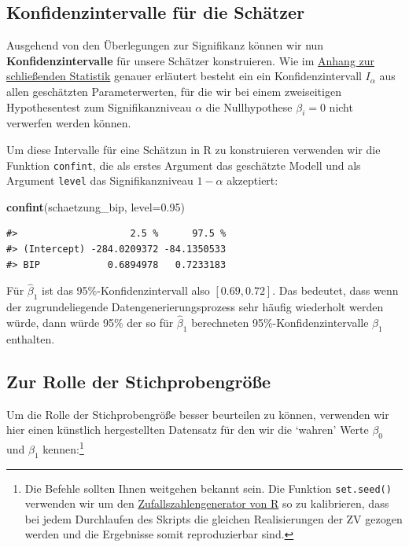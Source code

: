 \documentclass[]{book}
\newenvironment{Shaded}{\begin{snugshade}}{\end{snugshade}}
\newcommand{\KeywordTok}[1]{\textcolor[rgb]{0.13,0.29,0.53}{\textbf{#1}}}
\newcommand{\DataTypeTok}[1]{\textcolor[rgb]{0.13,0.29,0.53}{#1}}
\newcommand{\FloatTok}[1]{\textcolor[rgb]{0.00,0.00,0.81}{#1}}
\newcommand{\NormalTok}[1]{#1}
\let\rmarkdownfootnote\footnote%
\def\footnote{\protect\rmarkdownfootnote}
\begin{document}
\subsection{Konfidenzintervalle für die
Schätzer}\label{konfidenzintervalle-fur-die-schatzer}

Ausgehend von den Überlegungen zur Signifikanz können wir nun
\textbf{Konfidenzintervalle} für unsere Schätzer konstruieren. Wie im
\protect\hyperlink{stat-rep}{Anhang zur schließenden Statistik} genauer
erläutert besteht ein ein Konfidenzintervall \(I_{\alpha}\) aus allen
geschätzten Parameterwerten, für die wir bei einem zweiseitigen
Hypothesentest zum Signifikanzniveau \(\alpha\) die Nullhypothese
\(\beta_i=0\) nicht verwerfen werden können.

Um diese Intervalle für eine Schätzun in R zu konstruieren verwenden wir
die Funktion \texttt{confint}, die als erstes Argument das geschätzte
Modell und als Argument \texttt{level} das Signifikanzniveau
\(1-\alpha\) akzeptiert:

\begin{Shaded}
\begin{Highlighting}[]
\KeywordTok{confint}\NormalTok{(schaetzung_bip, }\DataTypeTok{level=}\FloatTok{0.95}\NormalTok{)}
\end{Highlighting}
\end{Shaded}

\begin{verbatim}
#>                    2.5 %      97.5 %
#> (Intercept) -284.0209372 -84.1350533
#> BIP            0.6894978   0.7233183
\end{verbatim}

Für \(\hat{\beta}_1\) ist das 95\%-Konfidenzintervall also
\([0.69, 0.72]\). Das bedeutet, dass wenn der zugrundeliegende
Datengenerierungsprozess sehr häufig wiederholt werden würde, dann würde
95\% der so für \(\hat{\beta}_1\) berechneten 95\%-Konfidenzintervalle
\(\beta_1\) enthalten.

\subsection{Zur Rolle der
Stichprobengröße}\label{zur-rolle-der-stichprobengroe}

Um die Rolle der Stichprobengröße besser beurteilen zu können, verwenden
wir hier einen künstlich hergestellten Datensatz für den wir die
`wahren' Werte \(\beta_0\) und \(\beta_1\) kennen:\footnote{Die Befehle
  sollten Ihnen weitgehen bekannt sein. Die Funktion \texttt{set.seed()}
  verwenden wir um den
  \href{https://de.wikipedia.org/wiki/Mersenne-Twister}{Zufallszahlengenerator
  von R} so zu kalibrieren, dass bei jedem Durchlaufen des Skripts die
  gleichen Realisierungen der ZV gezogen werden und die Ergebnisse somit
  reproduzierbar sind.}
\end{document}
